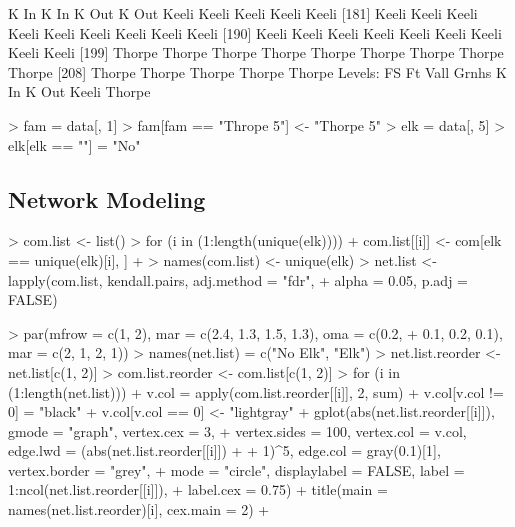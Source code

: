 \documentclass[11pt]{amsart}
\begin{document}
\begin{Schunk}
\begin{Soutput}
[172] K In    K In    K Out   K Out   Keeli   Keeli   Keeli   Keeli   Keeli  
[181] Keeli   Keeli   Keeli   Keeli   Keeli   Keeli   Keeli   Keeli   Keeli  
[190] Keeli   Keeli   Keeli   Keeli   Keeli   Keeli   Keeli   Keeli   Keeli  
[199] Thorpe  Thorpe  Thorpe  Thorpe  Thorpe  Thorpe  Thorpe  Thorpe  Thorpe 
[208] Thorpe  Thorpe  Thorpe  Thorpe  Thorpe 
Levels: FS Ft Vall Grnhs K In K Out Keeli Thorpe
\end{Soutput}
\begin{Sinput}
> fam = data[, 1]
> fam[fam == "Thrope 5"] <- "Thorpe 5"
> elk = data[, 5]
> elk[elk == ""] = "No"
\end{Sinput}
\end{Schunk}


\subsection{Network Modeling}


\begin{Schunk}
\begin{Sinput}
> com.list <- list()
> for (i in (1:length(unique(elk)))) {
+     com.list[[i]] <- com[elk == unique(elk)[i], ]
+ }
> names(com.list) <- unique(elk)
> net.list <- lapply(com.list, kendall.pairs, adj.method = "fdr", 
+     alpha = 0.05, p.adj = FALSE)
\end{Sinput}
\end{Schunk}


\begin{Schunk}
\begin{Sinput}
> par(mfrow = c(1, 2), mar = c(2.4, 1.3, 1.5, 1.3), oma = c(0.2, 
+     0.1, 0.2, 0.1), mar = c(2, 1, 2, 1))
> names(net.list) = c("No Elk", "Elk")
> net.list.reorder <- net.list[c(1, 2)]
> com.list.reorder <- com.list[c(1, 2)]
> for (i in (1:length(net.list))) {
+     v.col = apply(com.list.reorder[[i]], 2, sum)
+     v.col[v.col != 0] = "black"
+     v.col[v.col == 0] <- "lightgray"
+     gplot(abs(net.list.reorder[[i]]), gmode = "graph", vertex.cex = 3, 
+         vertex.sides = 100, vertex.col = v.col, edge.lwd = (abs(net.list.reorder[[i]]) + 
+             1)^5, edge.col = gray(0.1)[1], vertex.border = "grey", 
+         mode = "circle", displaylabel = FALSE, label = 1:ncol(net.list.reorder[[i]]), 
+         label.cex = 0.75)
+     title(main = names(net.list.reorder)[i], cex.main = 2)
+ }
\end{Sinput}
\end{Schunk}
\end{document}
